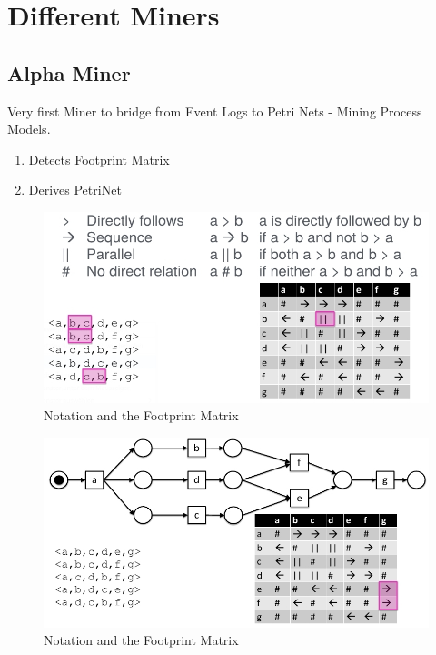 \pagebreak
\section{Different Miners}
\subsection{Alpha Miner}
Very first Miner to bridge from Event Logs to Petri Nets - Mining Process Models.

\begin{enumerate}
\item Detects Footprint Matrix
\item Derives PetriNet
\end{enumerate}

\begin{figure}[H]
\includegraphics[width=14cm]{Chapters/Notizen_Graphics/Notation_FootprintMatrix.jpg}
\caption{Notation and the Footprint Matrix} 
\end{figure}

\begin{figure}[H]
\includegraphics[width=14cm]{Chapters/Notizen_Graphics/Notation_FootprintMatrix_PetriNet.jpg}
\caption{Notation and the Footprint Matrix} 
\end{figure}

